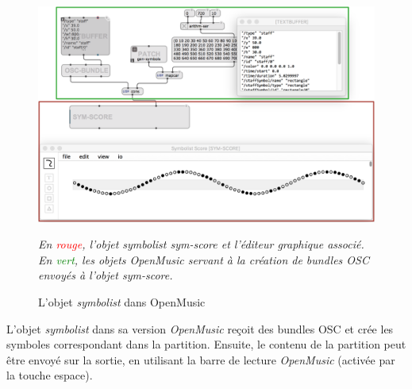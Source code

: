 \begin{figure}[H]
	\centering
	\includegraphics[keepaspectratio=true, width=\textwidth]{SymbolistOutilDeRecherche/i/symbolistOMObject.png}
	\caption{L'objet \textit{symbolist} dans OpenMusic}
	\label{fig:symbolistOMObject}
	\small
	\it
	En \textcolor{red}{rouge}, l'objet \emph{symbolist} \og sym-score \fg et l'éditeur graphique associé.
	En \textcolor{green}{vert}, les objets \emph{OpenMusic} servant à la création de bundles OSC envoyés à l'objet \emph{sym-score}.
\end{figure}

L'objet \textit{symbolist} dans sa version \textit{OpenMusic} reçoit des bundles OSC et crée les symboles correspondant dans la partition. Ensuite, le contenu de la partition peut être envoyé sur la sortie, en utilisant la barre de lecture \textit{OpenMusic} (activée par la touche espace).    

